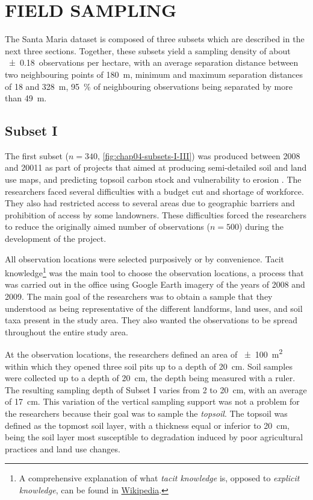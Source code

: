 \section{FIELD SAMPLING}
\label{sec:chap04-sampling}

The Santa Maria dataset is composed of three subsets which are described in the next three sections. Together, 
these subsets yield a sampling density of about \num{\pm0.18}~observations per hectare, with an average 
separation distance between two neighbouring points of \SI{180}{\metre}, minimum and maximum separation 
distances of \num{18} and \SI{328}{\metre}, \SI{95}{\percent} of neighbouring observations being separated by 
more than \SI{49}{\metre}.

\subsection{Subset I}

The first subset ($n = 340$, \autoref{fig:chap04-subsets-I-III}) was produced between 2008 and 20011 as part 
of projects that aimed at producing semi-detailed soil and land use maps, and predicting topsoil carbon stock 
and vulnerability to erosion \cite{Samuel-Rosa2009, SamuelRosaEtAl2011a, MiguelEtAl2012, Moura-BuenoEtAl2012, 
Samuel-RosaEtAl2013}. The researchers faced several difficulties with a budget cut and shortage of workforce. 
They also had restricted access to several areas due to geographic barriers and prohibition of access by some 
landowners. These difficulties forced the researchers to reduce the originally aimed number of observations ($n 
= 500$) during the development of the project.

\def\foottacit{\footnote{A comprehensive explanation of what \emph{tacit knowledge} is, opposed to 
\emph{explicit knowledge}, can be found in \href{https://en.wikipedia.org/wiki/Tacit_knowledge}{Wikipedia}.}}

All observation locations were selected purposively or by convenience. Tacit knowledge\foottacit{} was the 
main tool to choose the observation locations, a process that was carried out in the office using 
Google Earth\rr{} imagery of the years of \num{2008} and \num{2009}. The main goal of the researchers was to 
obtain a sample that they understood as being representative of the different landforms, land uses, and soil 
taxa present in the study area. They also wanted the observations to be spread throughout the entire study 
area.

At the observation locations, the researchers defined an area of \SI{\pm100}{\metre\squared} within which they 
opened three soil pits up to a depth of \SI{20}{\centi\metre}. Soil samples were collected up to a depth of 
\SI{20}{\centi\metre}, the depth being measured with a ruler. The resulting sampling depth of Subset I varies 
from \num{2} to \SI{20}{\centi\metre}, with an average of \SI{17}{\centi\metre}. This variation of the 
vertical sampling support was not a problem for the researchers because their goal was to sample the 
\emph{topsoil}. The topsoil was defined as the topmost soil layer, with a thickness equal or inferior to 
\SI{20}{\centi\metre}, being the soil layer most susceptible to degradation induced by poor agricultural 
practices and land use changes.

